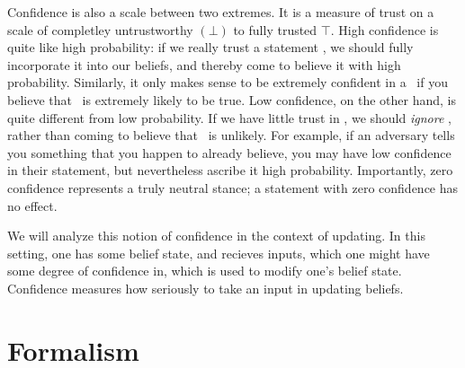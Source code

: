 \documentclass{article}
\begin{document}
Confidence is also a scale between two extremes. It is a measure of trust on a scale of completley untrustworthy $(\bot)$ to fully trusted $\top$. 
High confidence is quite like high probability: if we really trust a statement \stmt, we should fully incorporate it into our beliefs, and thereby come to believe it with high probability. 
Similarly, it only makes sense to be extremely confident in a \stmt\ if you believe that \stmt\ is extremely likely to be true. 
Low confidence, on the other hand, is quite different from low probability. 
If we have little trust in \stmt, we should \emph{ignore} \stmt, rather than coming to believe that \stmt\ is unlikely.
For example, if an adversary tells you something that you happen to already believe, you may have low confidence in their statement, but nevertheless ascribe it high probability. 
Importantly, zero confidence represents a truly neutral stance; a statement with zero confidence has no effect.  

We will analyze this notion of confidence in the context of updating.
In this setting, one has some belief state, and recieves inputs, which one might have some degree of confidence in, which is used to modify one's belief state. 
Confidence measures how seriously to take an input in updating beliefs. 




\section{Formalism}
\end{document}
